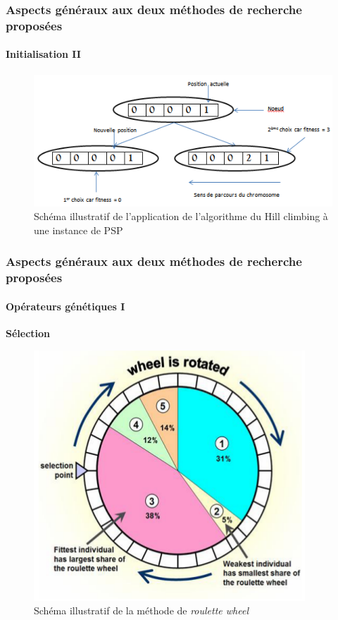 \documentclass[11pt]{beamer}
\begin{document}
 \begin{frame}
 \frametitle{Aspects généraux aux deux méthodes de recherche proposées}
 \framesubtitle{Initialisation II}
	
	\begin{figure}[!h]
		\begin{center}
			\includegraphics[scale=.5
			]{img/hill_climbing_fig.png}
			\caption{Schéma illustratif de l'application de l'algorithme du Hill climbing à une instance de PSP}
		\end{center}
 \end{figure}
	
 \end{frame}
 
 \begin{frame}
 \frametitle{Aspects généraux aux deux méthodes de recherche proposées}
 \framesubtitle{Opérateurs génétiques I}
	
	\textbf{Sélection}
	\begin{figure}[!h]
		\begin{center}
			\includegraphics[scale=.5
			]{img/wheel_fig.png}
			\caption{Schéma illustratif de la méthode de \emph{roulette wheel}}
		\end{center}
 \end{figure}
	
 \end{frame}
 
\end{document}
